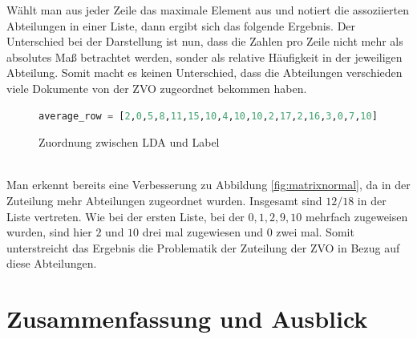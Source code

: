 \documentclass[german,version-2020-11]{uzl-thesis}
\begin{document}
\begin{itemize}
\begin{enumerate}
Wählt man aus jeder Zeile das maximale Element aus und notiert die assoziierten Abteilungen in einer Liste, dann ergibt sich das folgende Ergebnis. Der Unterschied bei der Darstellung ist nun, dass die Zahlen pro Zeile nicht mehr als absolutes Maß betrachtet werden, sonder als relative Häufigkeit in der jeweiligen Abteilung. Somit macht es keinen Unterschied, dass die Abteilungen verschieden viele Dokumente von der ZVO zugeordnet bekommen haben. \\

\begin{figure}[h]
\begin{center}
\begin{lstlisting}[language=Python]
average_row = [2,0,5,8,11,15,10,4,10,10,2,17,2,16,3,0,7,10]
\end{lstlisting}
\caption{Zuordnung zwischen LDA und Label} 
\end{center}
\end{figure}\\

Man erkennt bereits eine Verbesserung zu Abbildung \ref{fig:matrixnormal}, da in der Zuteilung mehr Abteilungen zugeordnet wurden. Insgesamt sind $12/18$ in der Liste vertreten. Wie bei der ersten Liste, bei der  $ 0,1,2,9,10 $ mehrfach zugeweisen wurden, sind hier $2$ und $10$ drei mal zugewiesen und $0$ zwei mal. Somit unterstreicht das Ergebnis die Problematik der Zuteilung der ZVO in Bezug auf diese Abteilungen. 

\end{enumerate}


\chapter{Zusammenfassung und Ausblick}%


\end{itemize}
\end{document}
